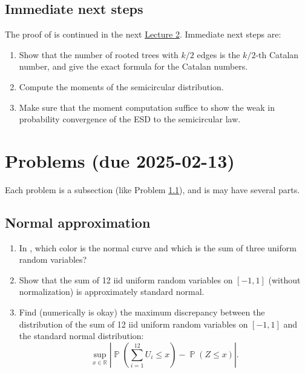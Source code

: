 \documentclass[letterpaper,11pt,oneside,reqno]{article}
\numberwithin{equation}{section}
\theoremstyle{definition}
\begin{document}
\subsection{Immediate next steps}

The proof of  is continued in the next
\href{https://lpetrov.cc/rmt25/rmt25-notes/rmt2025-l02.pdf}{Lecture 2}.
Immediate next steps are:
\begin{enumerate}
	\item Show that the number of rooted trees with $k/2$ edges is the $k/2$-th Catalan number, and give the exact formula for the Catalan numbers.
	\item Compute the moments of the semicircular distribution.
	\item Make sure that the moment computation suffice to show the
		weak in probability convergence of the ESD to the semicircular law.
\end{enumerate}


\appendix
\setcounter{section}{0}

\section{Problems (due 2025-02-13)}

Each problem is a subsection (like Problem \ref{prob:normal-approximation}),
and is may have several parts.

\subsection{Normal approximation}
\label{prob:normal-approximation}

\begin{enumerate}
	\item In , which color is
		the normal curve and which is the sum of three uniform random variables?
	\item Show that the sum of 12 iid uniform random variables on $[-1,1]$
		(without normalization) is approximately standard normal.
	\item Find (numerically is okay)
		the maximum discrepancy between the distribution of the sum of 12 iid uniform random variables on $[-1,1]$ and the standard normal distribution:
		\begin{equation*}
			\sup_{x \in \mathbb{R}} \left| \operatorname{\mathbb{P}}\left(  \sum_{i=1}^{12} U_i \leq x \right) - \operatorname{\mathbb{P}}\left( Z \leq x \right) \right|.
		\end{equation*}
\end{enumerate}
\end{document}
